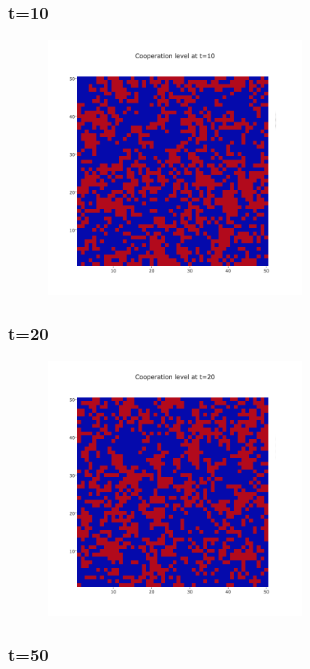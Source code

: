 \documentclass[11pt]{article}
\begin{document}
\subsubsection{t=10}

\begin{figure}[H]
\centering
   \includegraphics[width=0.6\textwidth]{img/part2/part2-moore-visu-10.png}
\end{figure}

\subsubsection{t=20}

\begin{figure}[H]
\centering
   \includegraphics[width=0.6\textwidth]{img/part2/part2-moore-visu-20.png}
\end{figure}

\subsubsection{t=50}
\end{document}
